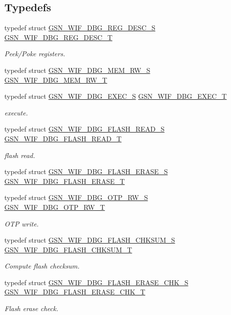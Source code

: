 \subsection*{Typedefs}
\begin{DoxyCompactItemize}
\item 
typedef struct \hyperlink{a00333}{GSN\_\-WIF\_\-DBG\_\-REG\_\-DESC\_\-S} \hyperlink{a00637_ga50b90f67a85a905f110ae0541038a9df}{GSN\_\-WIF\_\-DBG\_\-REG\_\-DESC\_\-T}
\begin{DoxyCompactList}\small\item\em Peek/Poke registers. \end{DoxyCompactList}\item 
typedef struct \hyperlink{a00331}{GSN\_\-WIF\_\-DBG\_\-MEM\_\-RW\_\-S} \hyperlink{a00637_ga3d7095f984e87958477ef9fc29b5f1cb}{GSN\_\-WIF\_\-DBG\_\-MEM\_\-RW\_\-T}
\item 
typedef struct \hyperlink{a00326}{GSN\_\-WIF\_\-DBG\_\-EXEC\_\-S} \hyperlink{a00637_ga0274185c1f8a4b9afb38a595ca615405}{GSN\_\-WIF\_\-DBG\_\-EXEC\_\-T}
\begin{DoxyCompactList}\small\item\em execute. \end{DoxyCompactList}\item 
typedef struct \hyperlink{a00330}{GSN\_\-WIF\_\-DBG\_\-FLASH\_\-READ\_\-S} \hyperlink{a00637_ga0f81223d9a8c224971d75ecd9be0abbe}{GSN\_\-WIF\_\-DBG\_\-FLASH\_\-READ\_\-T}
\begin{DoxyCompactList}\small\item\em flash read. \end{DoxyCompactList}\item 
typedef struct \hyperlink{a00329}{GSN\_\-WIF\_\-DBG\_\-FLASH\_\-ERASE\_\-S} \hyperlink{a00637_ga04e72a38064f50785b2adee075bde99b}{GSN\_\-WIF\_\-DBG\_\-FLASH\_\-ERASE\_\-T}
\item 
typedef struct \hyperlink{a00332}{GSN\_\-WIF\_\-DBG\_\-OTP\_\-RW\_\-S} \hyperlink{a00637_ga473dfdb8d324eb53e02c97fb0afb35d0}{GSN\_\-WIF\_\-DBG\_\-OTP\_\-RW\_\-T}
\begin{DoxyCompactList}\small\item\em OTP write. \end{DoxyCompactList}\item 
typedef struct \hyperlink{a00327}{GSN\_\-WIF\_\-DBG\_\-FLASH\_\-CHKSUM\_\-S} \hyperlink{a00637_gae6d33809d08da1c3b8849bf9c186f2fa}{GSN\_\-WIF\_\-DBG\_\-FLASH\_\-CHKSUM\_\-T}
\begin{DoxyCompactList}\small\item\em Compute flash checksum. \end{DoxyCompactList}\item 
typedef struct \hyperlink{a00328}{GSN\_\-WIF\_\-DBG\_\-FLASH\_\-ERASE\_\-CHK\_\-S} \hyperlink{a00637_gaa7c0146330fb5ac3b4707339435d871d}{GSN\_\-WIF\_\-DBG\_\-FLASH\_\-ERASE\_\-CHK\_\-T}
\begin{DoxyCompactList}\small\item\em Flash erase check. \end{DoxyCompactList}\end{DoxyCompactItemize}


